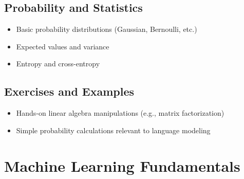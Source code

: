 \documentclass[12pt]{book}
\begin{document}
\section{Probability and Statistics}
\begin{itemize}
    \item Basic probability distributions (Gaussian, Bernoulli, etc.)
    \item Expected values and variance
    \item Entropy and cross-entropy
\end{itemize}

\section{Exercises and Examples}
\begin{itemize}
    \item Hands-on linear algebra manipulations (e.g., matrix factorization)
    \item Simple probability calculations relevant to language modeling
\end{itemize}


\chapter{Machine Learning Fundamentals}




\end{document}
